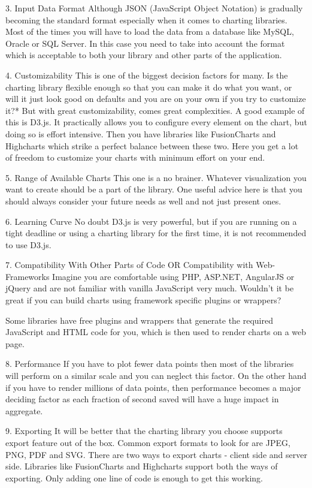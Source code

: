 3. Input Data Format
Although JSON (JavaScript Object Notation) is gradually becoming the standard format especially when it comes to charting libraries. Most of the times you will have to load the data from a database like MySQL, Oracle or SQL Server. In this case you need to take into account the format which is acceptable to both your library and other parts of the application.

4. Customizability
This is one of the biggest decision factors for many. Is the charting library flexible enough so that you can make it do what you want, or will it just look good on defaults and you are on your own if you try to customize it?*
But with great customizability, comes great complexities. A good example of this is D3.js. It practically allows you to configure every element on the chart, but doing so is effort intensive. Then you have libraries like FusionCharts and Highcharts which strike a perfect balance between these two. Here you get a lot of freedom to customize your charts with minimum effort on your end.

5. Range of Available Charts
This one is a no brainer. Whatever visualization you want to create should be a part of the library. One useful advice here is that you should always consider your future needs as well and not just present ones.


6. Learning Curve
No doubt D3.js is very powerful, but if you are running on a tight deadline or using a charting library for the first time, it is not recommended to use D3.js.

7. Compatibility With Other Parts of Code OR Compatibility with Web-Frameworks
Imagine you are comfortable using PHP, ASP.NET, AngularJS or jQuery and are not familiar with vanilla JavaScript very much. Wouldn’t it be great if you can build charts using framework specific plugins or wrappers?

Some libraries have free plugins and wrappers that generate the required JavaScript and HTML code for you, which is then used to render charts on a web page.

8. Performance
If you have to plot fewer data points then most of the libraries will perform on a similar scale and you can neglect this factor. On the other hand if you have to render millions of data points, then performance becomes a major deciding factor as each fraction of second saved will have a huge impact in aggregate.

9. Exporting
It will be better that the charting library you choose supports export feature out of the box. Common export formats to look for are JPEG, PNG, PDF and SVG. There are two ways to export charts - client side and server side. Libraries like FusionCharts and Highcharts support both the ways of exporting. Only adding one line of code is enough to get this working.

